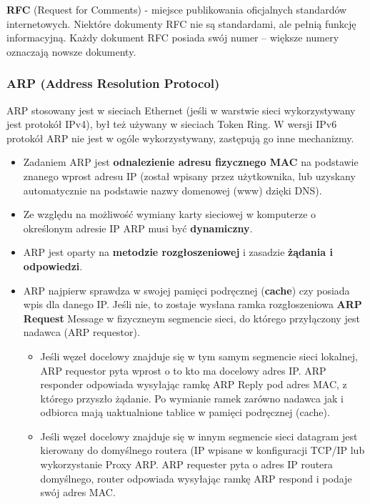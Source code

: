 \documentclass[a4paper]{article}
\begin{document}
\textbf{RFC} (Request for Comments) - miejsce publikowania oficjalnych standardów internetowych. Niektóre dokumenty RFC nie są standardami, ale pełnią funkcję informacyjną. Każdy dokument RFC posiada swój numer – większe numery oznaczają nowsze dokumenty.

\subsubsection{ARP (Address Resolution Protocol)}
ARP stosowany jest w sieciach Ethernet (jeśli w warstwie sieci wykorzystywany jest protokół
IPv4), był też używany w sieciach Token Ring. W wersji IPv6 protokół ARP nie jest w ogóle wykorzystywany, zastępują go inne mechanizmy.\\

\begin{itemize}
    \item  Zadaniem ARP jest \textbf{odnalezienie adresu fizycznego MAC} na podstawie znanego wprost adresu IP (został wpisany przez użytkownika, lub uzyskany automatycznie na podstawie nazwy domenowej (www) dzięki DNS).
    \item Ze względu na możliwość wymiany karty sieciowej w komputerze o określonym adresie IP ARP musi być \textbf{dynamiczny}.
    \item ARP jest oparty na \textbf{metodzie rozgłoszeniowej} i zasadzie \textbf{żądania i odpowiedzi}.
    \item ARP najpierw sprawdza w swojej pamięci podręcznej (\textbf{cache}) czy posiada wpis dla danego IP. Jeśli nie, to zostaje wysłana ramka rozgłoszeniowa \textbf{ARP Request} Message w fizyczneym segmencie sieci, do którego przyłączony jest nadawca (ARP requestor).
    \begin{itemize}
        \item Jeśli węzeł docelowy znajduje się w tym samym segmencie sieci lokalnej, ARP requestor pyta wprost o to kto ma docelowy adres IP. ARP responder odpowiada wysyłając ramkę ARP Reply pod adres MAC, z którego przyszło żądanie. Po wymianie ramek zarówno nadawca jak i odbiorca mają uaktualnione tablice w pamięci podręcznej (cache).
        \item Jeśli węzeł docelowy znajduje się w innym segmencie sieci datagram jest kierowany do domyślnego routera (IP wpisane w konfiguracji TCP/IP lub wykorzystanie Proxy ARP. ARP requester pyta o adres IP routera domyślnego, router odpowiada wysyłając ramkę ARP respond i podaje swój adres MAC.
    \end{itemize}

\end{itemize}
\end{document}
